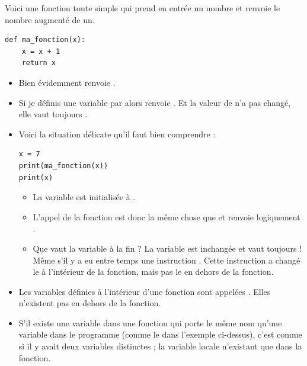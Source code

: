 \documentclass[11pt,class=report,crop=false]{standalone}
\begin{document}
\begin{cours}


Voici une fonction toute simple qui prend en entrée un nombre et renvoie le nombre augmenté de un.
\begin{center}
\begin{lstlisting}
def ma_fonction(x):
    x = x + 1
    return x
\end{lstlisting}
\end{center}

\begin{itemize}
  \item Bien évidemment  renvoie .
  
  \item Si je définis une variable par  alors  renvoie . Et la valeur de  n'a pas changé, elle vaut toujours .
  
  \item Voici la situation délicate qu'il faut bien comprendre :
 \begin{center}
\begin{lstlisting}
x = 7
print(ma_fonction(x))
print(x)
\end{lstlisting}
\end{center}
  \begin{itemize}
    \item La variable  est initialisée à .
    
    \item L'appel de la fonction  est donc la même chose que 
      et renvoie logiquement .
     
    
    \item Que vaut la variable  à la fin ? La variable  est inchangée et vaut toujours  ! Même s'il y a eu entre temps une instruction . Cette instruction a changé le  à l'intérieur de la fonction, mais  pas le  en dehors de la fonction.
\end{itemize}   
\end{itemize} 
 
\bigskip

\begin{itemize}
  \item Les variables définies à l'intérieur d'une fonction sont appelées 
. 
Elles n'existent pas en dehors de la fonction.
  
  \item S'il existe une variable dans une fonction qui porte le même nom qu'une variable dans le programme (comme le  dans l'exemple ci-dessus), c'est comme si il y avait deux variables distinctes ; la variable locale n'existant que dans la fonction.
  

\end{itemize}
\end{cours}
\end{document}
